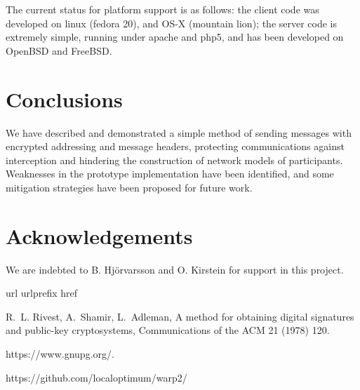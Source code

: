 \pdfoutput=1 \documentclass{article}
\begin{document}
The current status for platform support is as follows: the client code was developed on linux (fedora 20), and OS-X (mountain lion); the server code is extremely simple, running under apache and php5, and has been developed on OpenBSD and FreeBSD.



\section{Conclusions}
We have described and demonstrated a simple method of sending messages with encrypted addressing and message headers, protecting communications against interception and hindering the construction of network models of participants.  Weaknesses in the prototype implementation have been identified, and some mitigation strategies have been proposed for future work.






\section{Acknowledgements}
We are indebted to B. Hj\"{o}rvarsson and O. Kirstein for support in this project.



\begin{thebibliography}{1}
\expandafter\ifx\csname url\endcsname\relax
  \def\url#1{\texttt{#1}}\fi
\expandafter\ifx\csname urlprefix\endcsname\relax\def\urlprefix{URL }\fi
\expandafter\ifx\csname href\endcsname\relax
  \def\href#1#2{#2} \def\path#1{#1}\fi

R.~L. Rivest, A.~Shamir, L.~Adleman, A method for obtaining digital signatures
  and public-key cryptosystems, Communications of the ACM 21 (1978) 120.

https://www.gnupg.org/.

https://github.com/localoptimum/warp2/

\end{thebibliography}
\end{document}
